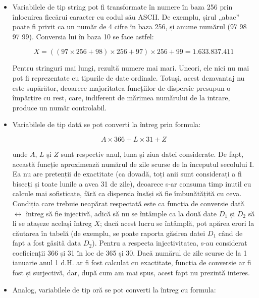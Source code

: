 \begin{itemize}

\item Variabilele de tip string pot fi transformate în numere în baza 256 prin
  înlocuirea fiecărui caracter cu codul său ASCII. De exemplu, șirul „abac”
  poate fi privit ca un număr de 4 cifre în baza 256, și anume numărul (97 98
  97 99). Conversia lui în baza 10 se face astfel:

  \begin{equation}
    X = ((97 \times  256 + 98) \times 256 + 97) \times 256 + 99 = 1.633.837.411
  \end{equation}


  Pentru stringuri mai lungi, rezultă numere mai mari. Uneori, ele nici nu mai
  pot fi reprezentate cu tipurile de date ordinale. Totuși, acest dezavantaj
  nu este supărător, deoarece majoritatea funcțiilor de dispersie presupun o
  împărțire cu rest, care, indiferent de mărimea numărului de la intrare,
  produce un număr controlabil.

\item Variabilele de tip dată se pot converti la întreg prin formula:

  \begin{equation}
    A \times 366 + L \times 31 + Z
  \end{equation}

  unde $A$, $L$ și $Z$ sunt respectiv anul, luna și ziua datei considerate. De
  fapt, această funcție aproximează numărul de zile scurse de la începutul
  secolului I. Ea nu are pretenții de exactitate (ca dovadă, toți anii sunt
  considerați a fi bisecți și toate lunile a avea 31 de zile), deoarece s-ar
  consuma timp inutil cu calcule mai sofisticate, fără ca dispersia însăși să
  fie îmbunătățită cu ceva. Condiția care trebuie neapărat respectată este ca
  funcția de conversie dată $\leftrightarrow$ întreg să fie injectivă, adică
  să nu se întâmple ca la două date $D_1$ și $D_2$ să li se atașeze același
  întreg $X$; dacă acest lucru se întâmplă, pot apărea erori la căutarea în
  tabelă (de exemplu, se poate raporta găsirea datei $D_1$ când de fapt a fost
  găsită data $D_2$). Pentru a respecta injectivitatea, s-au considerat
  coeficienții 366 și 31 în loc de 365 și 30. Dacă numărul de zile scurse de
  la 1 ianuarie anul 1 d.H. ar fi fost calculat cu exactitate, funcția de
  conversie ar fi fost și surjectivă, dar, după cum am mai spus, acest fapt nu
  prezintă interes.

\item Analog, variabilele de tip oră se pot converti la întreg cu formula:


\end{itemize}

